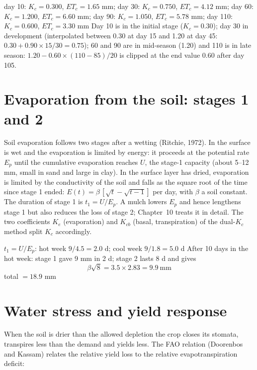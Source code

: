 \sol {}\ans day 10: $K_c=0.300$, $ET_c=1.65$ mm; day 30: $K_c=0.750$, $ET_c=4.12$ mm; day 60: $K_c=1.200$, $ET_c=6.60$ mm; day 90: $K_c=1.050$, $ET_c=5.78$ mm; day 110: $K_c=0.600$, $ET_c=3.30$ mm \ans Day 10 is in the initial stage ($K_c=0.30$); day 30 in development (interpolated between 0.30 at day 15 and 1.20 at day 45: $0.30+0.90\times15/30=0.75$); 60 and 90 are in mid-season (1.20) and 110 is in late season: $1.20-0.60\times(110-85)/20$ is clipped at the end value 0.60 after day 105. \finans

\section{Evaporation from the soil: stages 1 and 2}
Soil evaporation follows two stages after a wetting (Ritchie, 1972). In  the surface is wet and the evaporation is limited by energy: it proceeds at the potential rate $E_p$ until the cumulative evaporation reaches $U$, the stage-1 capacity (about 5--12 mm, small in sand and large in clay). In  the surface layer has dried, evaporation is limited by the conductivity of the soil and falls as the square root of the time since stage 1 ended: $E(t)=\beta\,[\sqrt{t}-\sqrt{t-1}]$ per day, with $\beta$ a soil constant. The duration of stage 1 is $t_1=U/E_p$. A mulch lowers $E_p$ and hence lengthens stage 1 but also reduces the loss of stage 2; Chapter~10 treats it in detail. The two coefficients $K_e$ (evaporation) and $K_{cb}$ (basal, transpiration) of the dual-$K_c$ method split $K_c$ accordingly.

\sol {}\ans $t_1=U/E_p$: hot week $9/4.5=2.0$ d; cool week $9/1.8=5.0$ d \ans After 10 days in the hot week: stage 1 gave 9 mm in 2 d; stage 2 lasts 8 d and gives \[\beta\sqrt{8}=3.5\times2.83=9.9\ \text{mm}\]
total $=18.9$ mm \finans

\section{Water stress and yield response}
When the soil is drier than the allowed depletion the crop closes its stomata, transpires less than the demand and yields less. The FAO relation (Doorenbos and Kassam) relates the relative yield loss to the relative evapotranspiration deficit:

